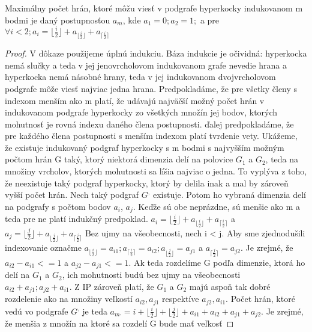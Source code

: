 \begin{veta}
\label{maximum}
Maximálny počet hrán, ktoré môžu viesť v podgrafe hyperkocky indukovanom m
bodmi je daný postupnosťou $a_{m}$, kde $a_{1} = 0; a_{2} = 1;$ a pre 
$\forall i < 2; a_{i} = \lfloor \frac {i}{2} \rfloor + a_{\lfloor \frac{i}{2}
\rfloor}
+ a_{\lceil \frac {i}{2} \rceil } $
\end{veta}
\begin{proof}
V dôkaze použijeme úplnú indukciu. Báza indukcie je očividná: hyperkocka
nemá slučky a teda v jej jenovrcholovom indukovanom grafe nevedie 
hrana a hyperkocka nemá
násobné hrany, teda v jej indukovanom dvojvrcholovom podgrafe 
môže viesť najviac jedna hrana. Predpokladáme, že pre všetky členy s
indexom menším ako m platí, že udávajú najväčší možný počet hrán v
indukovanom podgrafe hyperkocky zo všetkých množín jej bodov, ktorých 
mohutnosť je rovná  indexu daného člena postupnosti. ďalej predpokladáme, že
pre každého člena postupnosti s menším indexom platí tvrdenie vety.
Ukážeme, že existuje indukovaný podgraf hyperkocky s m bodmi 
s najvyšším možným počtom hrán G taký, ktorý niektorá dimenzia delí na
polovice $G_{1}$ a $G_{2}$, teda na množiny vrcholov, ktorých mohutnosti 
sa líšia najviac o
jedna. To vyplýva z toho, že neexistuje taký podgraf hyperkocky, 
ktorý by delila inak a mal by zároveň vyšší počet hrán.
Nech taký podgraf $G^{,}$ existuje. Potom ho vybraná dimenzia delí na podgrafy s
počtom bodov $a_{i}$, $a_{j}$. Keďže sú obe neprázdne, sú menšie ako m a teda
pre ne platí indukčný predpoklad. $a_{i} = \lfloor \frac {i}{2} \rfloor + 
a_{\lfloor \frac{i}{2} \rfloor}+ a_{\lceil \frac {i}{2} \rceil }$ a $a_{j} = 
\lfloor \frac {j}{2} \rfloor + 
a_{\lfloor \frac{j}{2} \rfloor}+ a_{\lceil \frac {j}{2} \rceil }$
Bez ujmy na všeobecnosti, nech i < j. Aby sme zjednodušili indexovanie
označme $a_{\lfloor \frac{i}{2} \rfloor} = a_{i1}; a_{\lceil \frac {i}{2} \rceil }
= a_{i2}; a_{\lfloor \frac{j}{2} \rfloor} = a_{j1}$ a $a_{\lceil \frac {j}{2} \rceil }
= a_{j2}$.
Je zrejmé, že $a_{i2} - a_{i1} <= 1$ a $a_{j2} - a_{j1} <= 1$. Ak teda
rozdelíme G podľa dimenzie, ktorá ho delí na $G_{1}$ a $G_{2}$, ich mohutnosti
budú bez ujmy na všeobecnosti $a_{i2} + a_{j1}; a_{j2} + a_{i1}$. Z IP
zároveň platí, že $G_{1}$ a $G_{2}$ majú aspoň tak dobré rozdelenie ako na
množiny veľkostí $a_{i2}, a_{j1}$ respektíve $a_{j2}, a_{i1}$.
Počet hrán, ktoré vedú vo podgrafe $G^{,}$ je teda
$a_{m^{,}}=i + \lfloor \frac{i}{2} \rfloor 
+ \lfloor \frac{j}{2} \rfloor + a_{i1} + a_{i2} + a_{j1} + a_{j2}$.
Je zrejmé, že menšia z množín na ktoré sa rozdelí G bude mať veľkosť

\end{proof}
